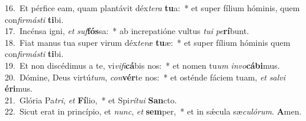 {16.~}Et pérfice eam, quam plantávit déx\textit{te}\textit{ra} \textbf{tu}a:~* et super fílium hóminis, quem con\textit{fir}\textit{má}\textit{sti} \textbf{ti}bi.\\
{17.~}Incénsa igni, \textit{et} \textit{suf}\textbf{fós}sa:~* ab increpatióne vultus \textit{tu}\textit{i} \textit{pe}\textbf{rí}bunt.\\
{18.~}Fiat manus tua super virum déx\textit{te}\textit{ræ} \textbf{tu}æ:~* et super fílium hóminis quem con\textit{fir}\textit{má}\textit{sti} \textbf{ti}bi.\\
{19.~}Et non discédimus a te, vi\textit{vi}\textit{fi}\textbf{cá}bis nos:~* et nomen tu\textit{um} \textit{in}\textit{vo}\textbf{cá}\textbf{bi}mus.\\
{20.~}Dómine, Deus virtú\textit{tum}, \textit{con}\textbf{vér}te nos:~* et osténde fáciem tuam, \textit{et} \textit{sal}\textit{vi} \textbf{é}\textbf{ri}mus.\\
{21.~}Glória Pa\textit{tri}, \textit{et} \textbf{Fí}lio,~* et Spi\textit{rí}\textit{tu}\textit{i} \textbf{San}cto.\\
{22.~}Sicut erat in princípio, et \textit{nunc}, \textit{et} \textbf{sem}per,~* et in sǽcula sæ\textit{cu}\textit{ló}\textit{rum}. \textbf{A}men.\\
